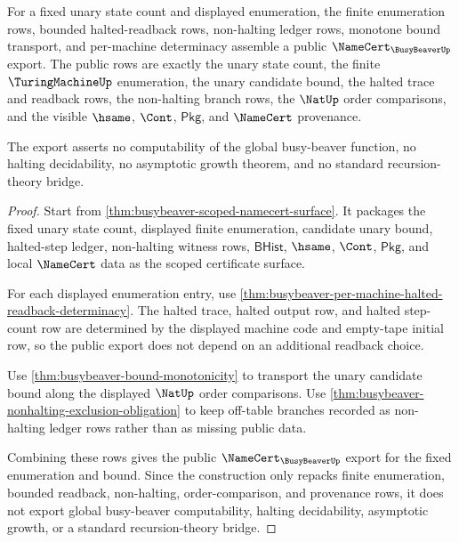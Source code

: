 \begin{theorem}
\label{thm:busybeaver-public-enumeration-bound-export}
For a fixed unary state count and displayed enumeration, the finite
enumeration rows, bounded halted-readback rows, non-halting ledger rows,
monotone bound transport, and per-machine determinacy assemble a public
$\NameCert_{\BusyBeaverUp}$ export. The public rows are exactly the unary state
count, the finite $\TuringMachineUp$ enumeration, the unary candidate bound,
the halted trace and readback rows, the non-halting branch rows, the $\NatUp$
order comparisons, and the visible $\hsame$, $\Cont$, $\mathsf{Pkg}$, and
$\NameCert$ provenance.

The export asserts no computability of the global busy-beaver function, no
halting decidability, no asymptotic growth theorem, and no standard
recursion-theory bridge.
\end{theorem}
\begin{proof}
Start from \autoref{thm:busybeaver-scoped-namecert-surface}. It packages the
fixed unary state count, displayed finite enumeration, candidate unary bound,
halted-step ledger, non-halting witness rows, $\mathsf{BHist}$, $\hsame$,
$\Cont$, $\mathsf{Pkg}$, and local $\NameCert$ data as the scoped certificate
surface.

For each displayed enumeration entry, use
\autoref{thm:busybeaver-per-machine-halted-readback-determinacy}. The halted
trace, halted output row, and halted step-count row are determined by the
displayed machine code and empty-tape initial row, so the public export does
not depend on an additional readback choice.

Use \autoref{thm:busybeaver-bound-monotonicity} to transport the unary
candidate bound along the displayed $\NatUp$ order comparisons. Use
\autoref{thm:busybeaver-nonhalting-exclusion-obligation} to keep off-table
branches recorded as non-halting ledger rows rather than as missing public
data.

Combining these rows gives the public
$\NameCert_{\BusyBeaverUp}$ export for the fixed enumeration and bound. Since
the construction only repacks finite enumeration, bounded readback,
non-halting, order-comparison, and provenance rows, it does not export global
busy-beaver computability, halting decidability, asymptotic growth, or a
standard recursion-theory bridge.
\end{proof}


